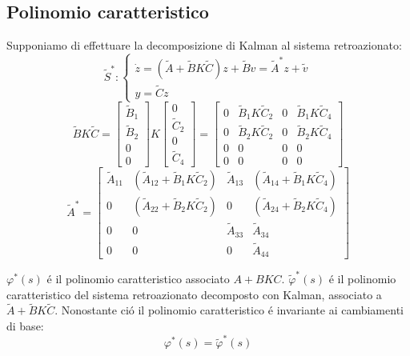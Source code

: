 \documentclass[../main.tex]{subfiles}
\begin{document}
	\subsection{Polinomio caratteristico}
		Supponiamo di effettuare la decomposizione di Kalman al sistema retroazionato:
		\[
			\tilde S^{*}:
			\begin{cases}
				\dot z = (\tilde A + \tilde B K \tilde C)z + \tilde B v = \tilde A^{*} z + \tilde v
				\\
				y = \tilde C z
			\end{cases}
		\]
		\[
			\tilde B K \tilde C =
			\begin{bmatrix}
				\tilde B_1\\
				\tilde B_2\\
				0\\
				0
			\end{bmatrix} K
			\begin{bmatrix}
				0\\
				\tilde C_2\\
				0\\
				\tilde C_4
			\end{bmatrix} =
			\begin{bmatrix}
				0 & \tilde B_1 K \tilde C_2 & 0 & \tilde B_1 K \tilde C_4\\
				0 & \tilde B_2 K \tilde C_2 & 0 & \tilde B_2 K \tilde C_4\\
				0 & 0 & 0 & 0\\
				0 & 0 & 0 & 0
			\end{bmatrix}
		\]
		\[
			\tilde A^{*} =
			\begin{bmatrix}
				\tilde A_{11} & (\tilde A_{12} + \tilde B_1 K \tilde C_2) & \tilde A_{13} & (\tilde A_{14} + \tilde B_1 K \tilde C_4)\\
				0 & (\tilde A_{22} + \tilde B_2 K \tilde C_2) & 0 & (\tilde A_{24} + \tilde B_2 K \tilde C_4)\\
				0 & 0 & \tilde A_{33} & \tilde A_{34}\\
				0 & 0 & 0 & \tilde A_{44}
			\end{bmatrix}
		\]
		
		$ \varphi^{*}(s) $ \'e il polinomio caratteristico associato $ A + BKC $. $ \tilde \varphi^{*}(s) $ \'e il polinomio caratteristico del sistema retroazionato decomposto con Kalman, associato a $ \tilde A + \tilde B K \tilde C $. Nonostante ci\'o il polinomio caratteristico \'e invariante ai cambiamenti di base:
		\[
			\varphi^{*}(s) = \tilde \varphi^{*}(s)
		\]
		
\end{document}
